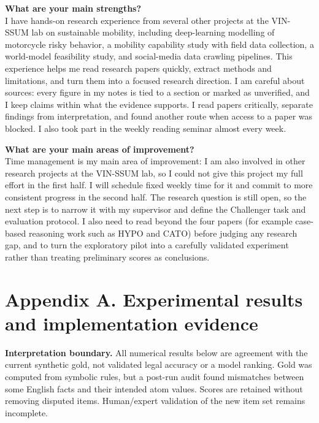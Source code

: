 \documentclass[11pt,a4paper]{article}
\begin{document}
\medskip
\textbf{What are your main strengths?}\\
I have hands-on research experience from several other projects at the VIN-SSUM lab on sustainable mobility, including deep-learning modelling of motorcycle risky behavior, a mobility capability study with field data collection, a world-model feasibility study, and social-media data crawling pipelines. This experience helps me read research papers quickly, extract methods and limitations, and turn them into a focused research direction. I am careful about sources: every figure in my notes is tied to a section or marked as unverified, and I keep claims within what the evidence supports. I read papers critically, separate findings from interpretation, and found another route when access to a paper was blocked. I also took part in the weekly reading seminar almost every week.

\textbf{What are your main areas of improvement?}\\
Time management is my main area of improvement: I am also involved in other research projects at the VIN-SSUM lab, so I could not give this project my full effort in the first half. I will schedule fixed weekly time for it and commit to more consistent progress in the second half. The research question is still open, so the next step is to narrow it with my supervisor and define the Challenger task and evaluation protocol. I also need to read beyond the four papers (for example case-based reasoning work such as HYPO and CATO) before judging any research gap, and to turn the exploratory pilot into a carefully validated experiment rather than treating preliminary scores as conclusions.

\clearpage

\pagestyle{plain}

\appendix

\section*{Appendix A. Experimental results and implementation evidence}


\textbf{Interpretation boundary.} All numerical results below are agreement with the current synthetic gold, not validated legal accuracy or a model ranking. Gold was computed from symbolic rules, but a post-run audit found mismatches between some English facts and their intended atom values. Scores are retained without removing disputed items. Human/expert validation of the new item set remains incomplete.
\end{document}
